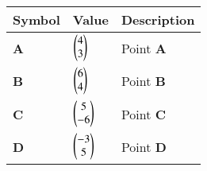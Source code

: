 \begin{tabular}{|m{5em} |m{5em}| m{10em} | }
    \hline
    \textbf{Symbol} &\textbf{Value} &\textbf{Description} \\
    \hline
        \textbf{A} & $\begin{pmatrix}4\\3\end{pmatrix}$ & Point \textbf{A} \\
    \hline
        \textbf{B} & $\begin{pmatrix}6\\4\end{pmatrix}$ & Point \textbf{B} \\
    \hline
        \textbf{C} & $\begin{pmatrix}5\\-6\end{pmatrix}$ & Point \textbf{C}\\
    \hline
        \textbf{D} & $\begin{pmatrix}-3\\5\end{pmatrix}$ & Point \textbf{D}\\
    \hline

    \end{tabular} 
